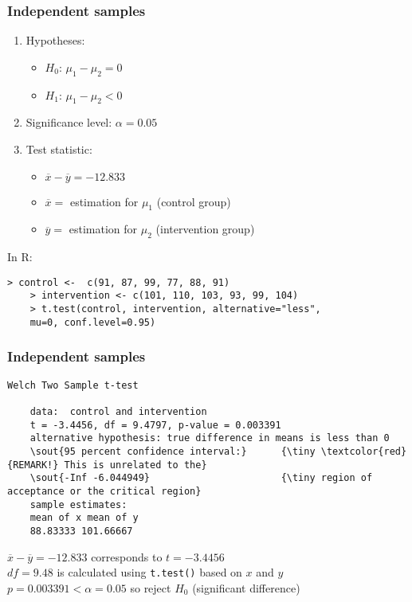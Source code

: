 \documentclass[aspectratio=169]{beamer}
\begin{document}
\begin{frame}[fragile]
  \frametitle{Independent samples}
  \begin{enumerate}
    \item Hypotheses:
    \begin{itemize}
      \item $H_0$: $\mu_1 - \mu_2 = 0$
      \item $H_1$: $\mu_1 - \mu_2 < 0$
    \end{itemize}
    \item Significance level: $\alpha = 0.05$
    \item Test statistic:
    \begin{itemize}
      \item $\overline{x}-\overline{y} = -12.833$
      \item $\overline{x} =$ estimation for $\mu_1$ (control group)
      \item $\overline{y} =$ estimation for $\mu_2$ (intervention group)
    \end{itemize}
  \end{enumerate}
  \vfill
  In R:
  {\footnotesize
    \begin{Verbatim}[commandchars=\\\{\}]
    > control <-  c(91, 87, 99, 77, 88, 91)
    > intervention <- c(101, 110, 103, 93, 99, 104)
    > t.test(control, intervention, alternative="less",
    mu=0, conf.level=0.95)
    \end{Verbatim}
  }
\end{frame}

\begin{frame}[fragile]
  \frametitle{Independent samples}
  
  {\footnotesize
    \begin{Verbatim}[commandchars=\\\{\}]
    Welch Two Sample t-test
    
    data:  control and intervention
    t = -3.4456, df = 9.4797, p-value = 0.003391
    alternative hypothesis: true difference in means is less than 0
    \sout{95 percent confidence interval:}      {\tiny \textcolor{red}{REMARK!} This is unrelated to the}
    \sout{-Inf -6.044949}                       {\tiny region of acceptance or the critical region}
    sample estimates:
    mean of x mean of y 
    88.83333 101.66667
    \end{Verbatim}
  }
  \vfill
  $\overline{x}-\overline{y}=-12.833$ corresponds to $t=-3.4456$\\
  $df=9.48$ is calculated using \texttt{t.test()} based on $x$ and $y$\\
  $p = 0.003391 < \alpha = 0.05$ so reject $H_0$ (significant difference)
\end{frame}
\end{document}
